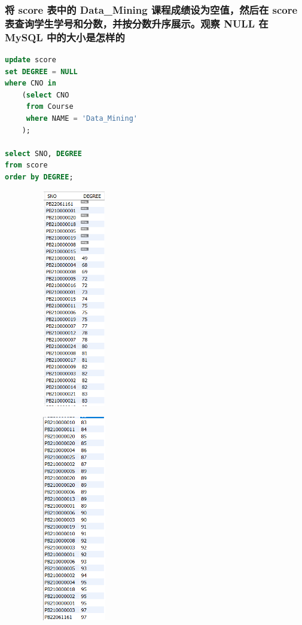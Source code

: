 \documentclass{ctexart}
\begin{document}
\subsubsection{将 score 表中的 Data\_Mining 课程成绩设为空值，然后在 score 表查询学生学号和分数，并按分数升序展示。观察 NULL 在 MySQL 中的大小是怎样的}
\begin{lstlisting}[language=sql]
update score
set DEGREE = NULL
where CNO in
	(select CNO
     from Course
     where NAME = 'Data_Mining'
	);
    
select SNO, DEGREE 
from score
order by DEGREE;
\end{lstlisting}
\begin{figure}[H]
	\centering 
	\includegraphics[height=9.5cm,width=4cm]{58.png}
	\end{figure}
	\begin{figure}[H]
		\centering 
		\includegraphics[height=9cm,width=4cm]{59.png}
		\end{figure}
\end{document}
